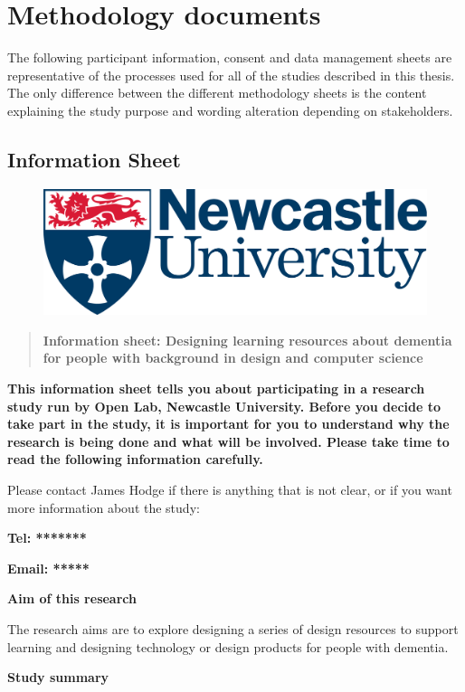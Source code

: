
\chapter{Methodology documents}
The following participant information, consent and data management sheets are representative of the processes used for all of the studies described in this thesis. The only difference between the different methodology sheets is the content explaining the study purpose and wording alteration depending on stakeholders.

\section{Information Sheet}
\label{app:infoSheets}
\begin{figure}[htp]
    \centering
    \includegraphics[width=0.5\linewidth]{Images/logo.png}
\end{figure}
\begin{quote}
\textbf{Information sheet: Designing learning resources about dementia for people with background
in design and computer science}
\end{quote}

\textbf{This information sheet tells you about participating in a research study run by Open Lab, Newcastle University. Before you decide to take part in the study, it is important for you to understand why the research is being done and what will be involved. Please take time to read the following information carefully.
}

Please contact James Hodge if there is anything that is not clear, or if you want more information about the study:

\textbf{Tel: *******}

\textbf{Email: *****}

\textbf{Aim of this research}

The research aims are to explore designing a series of design resources to support learning and designing technology or design products for people with dementia. 

\textbf{Study summary}

